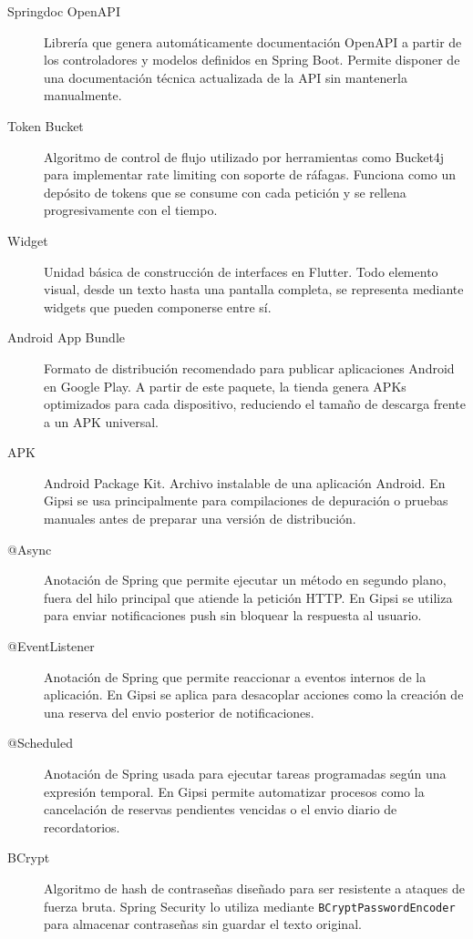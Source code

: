 \documentclass[12pt,a4paper,twoside]{report}
\begin{document}
\begin{description}
  \item[Springdoc OpenAPI]
  Librería que genera automáticamente documentación OpenAPI a partir de los controladores
  y modelos definidos en Spring Boot. Permite disponer de una documentación técnica
  actualizada de la API sin mantenerla manualmente.

  \item[Token Bucket]
  Algoritmo de control de flujo utilizado por herramientas como Bucket4j para implementar
  rate limiting con soporte de ráfagas. Funciona como un depósito de tokens que se consume
  con cada petición y se rellena progresivamente con el tiempo.

  \item[Widget]
  Unidad básica de construcción de interfaces en Flutter. Todo elemento visual, desde
  un texto hasta una pantalla completa, se representa mediante widgets que pueden
  componerse entre sí.

  \item[Android App Bundle]
  Formato de distribuci\'on recomendado para publicar aplicaciones Android en Google
  Play. A partir de este paquete, la tienda genera APKs optimizados para cada dispositivo,
  reduciendo el tama\~no de descarga frente a un APK universal.

  \item[APK]
  Android Package Kit. Archivo instalable de una aplicaci\'on Android. En Gipsi se usa
  principalmente para compilaciones de depuraci\'on o pruebas manuales antes de preparar
  una versi\'on de distribuci\'on.

  \item[@Async]
  Anotaci\'on de Spring que permite ejecutar un m\'etodo en segundo plano, fuera del hilo
  principal que atiende la petici\'on HTTP. En Gipsi se utiliza para enviar notificaciones
  push sin bloquear la respuesta al usuario.

  \item[@EventListener]
  Anotaci\'on de Spring que permite reaccionar a eventos internos de la aplicaci\'on.
  En Gipsi se aplica para desacoplar acciones como la creaci\'on de una reserva del envio
  posterior de notificaciones.

  \item[@Scheduled]
  Anotaci\'on de Spring usada para ejecutar tareas programadas seg\'un una expresi\'on
  temporal. En Gipsi permite automatizar procesos como la cancelaci\'on de reservas
  pendientes vencidas o el envio diario de recordatorios.

  \item[BCrypt]
  Algoritmo de hash de contrase\~nas dise\~nado para ser resistente a ataques de fuerza
  bruta. Spring Security lo utiliza mediante \texttt{BCryptPasswordEncoder} para almacenar
  contrase\~nas sin guardar el texto original.


\end{description}
\end{document}
